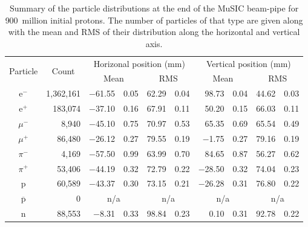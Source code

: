 \begin{table}[hptb]
  \begin{center}
  \begin{tabular}{c | r | r@{\(\pm\)}l | r@{\(\pm\)}l | r@{\(\pm\)}l | r@{\(\pm\)}l}
    \multicolumn{1}{c|}{\multirow{2}{*}{Particle}} 
               &   \multicolumn{1}{c|}{\multirow{2}{*}{Count}} 
                             &  \multicolumn{4}{c|}{Horizonal position (mm)}
                                              &  \multicolumn{4}{c}{Vertical position (mm)}    \\
               &             &  \multicolumn{2}{c|}{Mean}  
                                                   &  \multicolumn{2}{c|}{RMS}  
                                                         &  \multicolumn{2}{c|}{Mean}  
                                                                    &  \multicolumn{2}{c|}{RMS}  \\
    \hline
      e\(^-\)  &  1,362,161  &  \(-\)61.55 & 0.05  &  62.29 & 0.04  &       98.73 & 0.04  &  44.62 & 0.03  \\
      e\(^+\)  &    183,074  &  \(-\)37.10 & 0.16  &  67.91 & 0.11  &       50.20 & 0.15  &  66.03 & 0.11  \\
    \(\mu^-\)  &      8,940  &  \(-\)45.10 & 0.75  &  70.97 & 0.53  &       65.35 & 0.69  &  65.54 & 0.49  \\
    \(\mu^+\)  &     86,480  &  \(-\)26.12 & 0.27  &  79.55 & 0.19  &   \(-\)1.75 & 0.27  &  79.16 & 0.19  \\
    \(\pi^-\)  &      4,169  &  \(-\)57.50 & 0.99  &  63.99 & 0.70  &       84.65 & 0.87  &  56.27 & 0.62  \\
    \(\pi^+\)  &     53,406  &  \(-\)44.19 & 0.32  &  72.79 & 0.22  &  \(-\)28.50 & 0.32  &  74.04 & 0.23  \\
       p       &     60,589  &  \(-\)43.37 & 0.30  &  73.15 & 0.21  &  \(-\)26.28 & 0.31  &  76.80 & 0.22  \\
    \(\overline{\text{p}}\)
               &          0  & \multicolumn{2}{c|}{n/a}  
                                                   &  \multicolumn{2}{c}{n/a}
                                                                    & \multicolumn{2}{c}{n/a}
                                                                               &  \multicolumn{2}{c}{n/a}  \\
       n       &     88,553  &   \(-\)8.31 & 0.33  &  98.84 & 0.23  &        0.10 & 0.31  &  92.78 & 0.22  \\
  \end{tabular}
  \end{center}
  \caption{Summary of the particle distributions at the end of the MuSIC beam-pipe for 900~million initial protons. The number of particles of that type are given along with the mean and RMS of their distribution along the horizontal and vertical axis.}
  \label{tab:g4bl_particle_counts}
\end{table}

